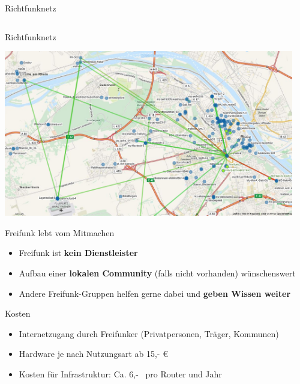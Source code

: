 \documentclass[t]{beamer}
\begin{document}
\begin{frame}{Richtfunknetz}
\begin{columns}
\begin{column}{0.25\textwidth}
\begin{center}
        \end{center}
      \end{column}
    \end{columns}
  \end{frame}

  \begin{frame}{Richtfunknetz}
    \begin{center}
      \includegraphics[width=0.95\textwidth]{images/2016-06-12_map-mainz-rifu}
    \end{center}
  \end{frame}

  \begin{frame}{Freifunk lebt vom Mitmachen}
    \begin{itemize}
      \item Freifunk ist \textbf{kein Dienstleister}
      \item Aufbau einer \textbf{lokalen Community} (falls nicht vorhanden) wünschenswert
      \item Andere Freifunk-Gruppen helfen gerne dabei und \textbf{geben Wissen weiter}
    \end{itemize}
  \end{frame}

  \begin{frame}{Kosten}
    \begin{itemize}
      \item Internetzugang durch Freifunker (Privatpersonen, Träger, Kommunen)
      \item Hardware je nach Nutzungsart ab 15,- €
      \item Kosten für Infrastruktur: Ca. 6,- \texteuro\ pro Router und Jahr
    \end{itemize}
  \end{frame}
\end{document}
